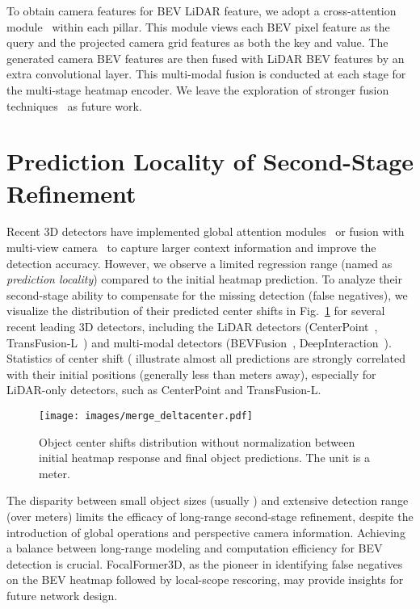 \documentclass[10pt,twocolumn,letterpaper]{article}
\begin{document}
To obtain camera features for BEV LiDAR feature, we adopt a cross-attention module~\cite{deepinteraction} within each pillar. This module views each BEV pixel feature as the query and the projected camera grid features as both the key and value. The generated camera BEV features are then fused with LiDAR BEV features by an extra convolutional layer. This multi-modal fusion is conducted at each stage for the multi-stage heatmap encoder. We leave the exploration of stronger fusion techniques~\cite{bevfusion, deepinteraction, bevfusionmit} as future work.

\section{Prediction Locality of Second-Stage Refinement}
\label{sec: prediction locality}
Recent 3D detectors have implemented global attention modules~\cite{transfusion} or fusion with multi-view camera~\cite{bevfusion, deepinteraction} to capture larger context information and improve the detection accuracy. However, we observe a limited regression range (named as \textit{prediction locality}) compared to the initial heatmap prediction. To analyze their second-stage ability to compensate for the missing detection (false negatives), we visualize the distribution of their predicted center shifts  in Fig.~\ref{fig:deltacenter} for several recent leading 3D detectors, including the LiDAR detectors (CenterPoint~\cite{centerpoint}, TransFusion-L~\cite{transfusion}) and multi-modal detectors (BEVFusion~\cite{bevfusion}, DeepInteraction~\cite{deepinteraction}). Statistics of center shift ( illustrate almost all predictions are strongly correlated with their initial positions (generally less than  meters away), especially for LiDAR-only detectors, such as CenterPoint and TransFusion-L. 

\begin{figure}[h]
	\begin{center}
		\texttt{[image: images/merge\_deltacenter.pdf]}
	\end{center}
	\caption{Object center shifts  distribution without normalization between initial heatmap response and final object predictions. The unit is a meter.}
	\label{fig:deltacenter}
\end{figure}

The disparity between small object sizes (usually ) and extensive detection range (over  meters) limits the efficacy of long-range second-stage refinement, despite the introduction of global operations and perspective camera information. Achieving a balance between long-range modeling and computation efficiency for BEV detection is crucial. FocalFormer3D, as the pioneer in identifying false negatives on the BEV heatmap followed by local-scope rescoring, may provide insights for future network design.
\end{document}
